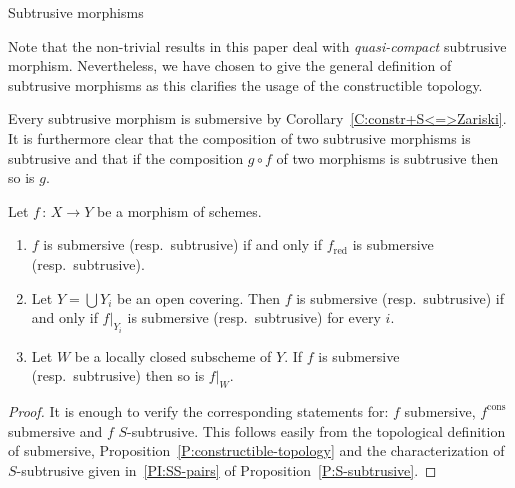 \documentclass[a4paper,twoside,11pt]{amsart}[2009/07/02] %
\newcommand{\pref}[1]{\eqref{#1}}
\newcommand{\map}[3]{#1\,:\, #2\rightarrow #3}
\newcommand{\cons}{\mathrm{cons}} %
\newcommand{\red}{\mathrm{red}}
\begin{document}
\begin{section}{Subtrusive morphisms}
\begin{remark}
Note that the non-trivial results in this paper deal with
\emph{quasi-compact} subtrusive morphism. Nevertheless, we have chosen to give
the general definition of subtrusive morphisms as this clarifies the usage of
the constructible topology.
\end{remark}


Every subtrusive morphism is submersive by
Corollary~\pref{C:constr+S<=>Zariski}. It is furthermore clear that the
composition of two subtrusive morphisms is subtrusive and that if the
composition $g\circ f$ of two morphisms is subtrusive then so is $g$.

\begin{proposition}\label{P:locality-of-subtrusiveness}
Let $\map{f}{X}{Y}$ be a morphism of schemes.
%
\begin{enumerate}
\item $f$ is submersive (resp.\ subtrusive) if and only if $f_\red$ is
submersive (resp.\ subtrusive).
\item Let $Y=\bigcup Y_i$ be an open covering. Then $f$ is submersive
(resp.\ subtrusive) if and only if $f|_{Y_i}$ is submersive (resp.\ subtrusive)
for every $i$.
\item Let $W$ be a locally closed subscheme of $Y$. If $f$ is submersive
(resp.\ subtrusive) then so is $f|_W$.
\end{enumerate}
\end{proposition}
\begin{proof}
It is enough to verify the corresponding statements for: $f$ submersive,
$f^{\cons}$ submersive and $f$ $S$-subtrusive. This
follows easily from the topological definition of submersive,
Proposition~\pref{P:constructible-topology} and the characterization of
$S$-subtrusive given in~\ref{PI:SS-pairs} of Proposition~\pref{P:S-subtrusive}.
\end{proof}


\end{section}
\end{document}
